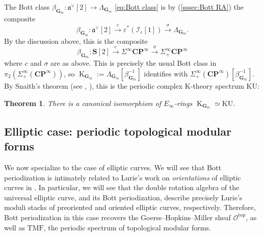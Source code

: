 \documentclass[12pt, oneside]{amsart}
\numberwithin{equation}{section}
\newtheorem{theorem}[subsubsection]{Theorem}
\theoremstyle{remark}
\theoremstyle{plain}
\newcommand{\frav}{\mathfrak{a}^\vee}
\newcommand{\lam}{\Lambda}
\newcommand{\OO}{\mathcal{O}}
\newcommand{\GGm}{\mathbf{G}_{m}}
\newcommand{\K}{\operatorname{K}}
\newcommand{\eps}{\varepsilon}
\begin{document}
\subsubsection{}

The Bott class $\beta_{\GGm} : \frav[2] \to \lam_{\GGm}$ \eqref{eq:Bott class} is by (\ref{sssec:Bott RA}) the composite
\begin{equation*}
	\beta_{\GGm} : \frav[2] \xrightarrow{c} \eps^*(\mathcal{I}_{\eps}[1]) \xrightarrow{\sigma} \lam_{\GGm}.
\end{equation*}
By the discussion above, this is the composite
\[
  \beta_{\GGm} : \mathbf{S}[2] \xrightarrow{c} \Sigma^\infty \mathbf{C}\mathbf{P}^\infty \xrightarrow{\sigma} \Sigma^\infty_+ \mathbf{C}\mathbf{P}^\infty
\]
where $c$ and $\sigma$ are as above.
This is precisely the usual Bott class in $\pi_2(\Sigma^\infty_+(\mathbf{C}\mathbf{P}^\infty))$, so $\K_{\GGm} := \lam_{\GGm}[\beta_{\GGm}^{-1}]$ identifies with $\Sigma^\infty_+(\mathbf{C}\mathbf{P}^\infty)[\beta_{\GGm}^{-1}]$.
By Snaith's theorem (see \cite{Snaith}, \cite[Thm.~6.5.1]{LurieEll2}), this is the periodic complex K-theory spectrum $\mathrm{KU}$:

\begin{theorem}\label{thm:Snaith}
There is a canonical isomorphism of $E_\infty$-rings $\K_{\GGm} \simeq \mathrm{KU}$.
\end{theorem}

\subsection{Elliptic case: periodic topological modular forms}\label{ssec:TMF}

We now specialize to the case of elliptic curves.
We will see that Bott periodization is intimately related to Lurie's work on \emph{orientations} of elliptic curves in \cite{LurieEll2}.
In particular, we will see that the double rotation algebra of the universal elliptic curve, and its Bott periodization, describe precisely Lurie's moduli stacks of preoriented and oriented elliptic curves, respectively.
Therefore, Bott periodization in this case recovers the Goerss--Hopkins--Miller sheaf $\OO^{\mathrm{top}}$, as well as $\mathrm{TMF}$, the periodic spectrum of topological modular forms.

\subsubsection{}
\end{document}
